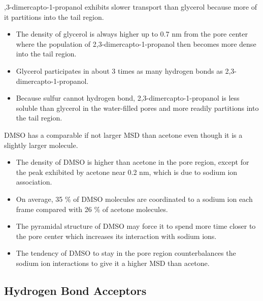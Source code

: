 \documentclass{article}
\begin{document}
  ,3-dimercapto-1-propanol exhibits slower transport than glycerol 
  because more of it partitions into the tail region. %
  \begin{itemize}
    \item The density of glycerol is always higher up to 0.7 nm from the 
    pore center where the population of 2,3-dimercapto-1-propanol then 
    becomes more dense into the tail region. 
    \item Glycerol participates in about 3 times as many hydrogen bonds
    as 2,3-dimercapto-1-propanol. %
    \item Because sulfur cannot hydrogen bond, 2,3-dimercapto-1-propanol is 
    less soluble than glycerol in the water-filled pores and more readily 
    partitions into the tail region.
  \end{itemize} 
  
  \noindent DMSO has a comparable if not larger MSD than acetone even though it
  is a slightly larger molecule.
  \begin{itemize}
    \item The density of DMSO is higher than acetone in the pore region,
    except for the peak exhibited by acetone near 0.2 nm, which is due to 
    sodium ion association.
    \item On average, 35 \% of DMSO molecules are coordinated to a sodium ion each
    frame compared with 26 \% of acetone molecules.
  	\item The pyramidal structure of DMSO may force it to spend more time closer to
  	the pore center which increases its interaction with sodium ions.
  	\item The tendency of DMSO to stay in the pore region counterbalances the
  	sodium ion interactions to give it a higher MSD than acetone. 
  \end{itemize}  
  
  \subsection*{Hydrogen Bond Acceptors}  %
\end{document}
